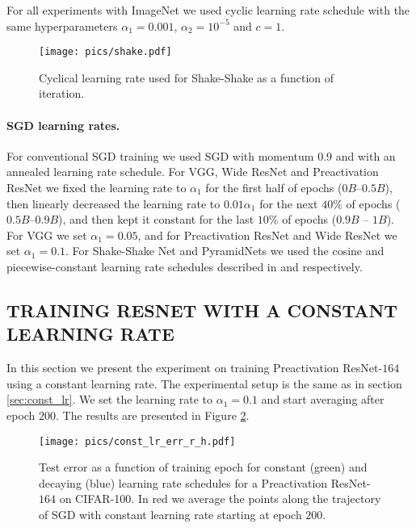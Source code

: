 \documentclass[letterpaper]{article}
\begin{document}
For all experiments with ImageNet we used cyclic learning rate schedule with the same 
hyperparameters  $\alpha_1 =0.001$, $\alpha_2=10^{-5}$ and $c=1$.

\begin{figure}[!t]
	\centering
	\texttt{[image: pics/shake.pdf]}
	\caption{
        Cyclical learning rate used for Shake-Shake as a function of iteration. 
    }
	\label{fig:lr_shk}    	
\end{figure}

\paragraph{SGD learning rates.}
For conventional SGD training we used SGD with momentum $0.9$ and with
an annealed learning rate schedule. For VGG, Wide ResNet and Preactivation 
ResNet we fixed the learning rate to $\alpha_1$ for the first half of epochs
($0B$--$0.5B$), then linearly decreased the learning rate to $0.01 \alpha_1$ 
for the next $40\%$ of epochs ($0.5B$--$0.9B$), and then kept it constant
for the last $10\%$ of epochs ($0.9B$ -- $1 B$). For VGG we set $\alpha_1 = 0.05$,
and for Preactivation ResNet and Wide ResNet we set $\alpha_1 = 0.1$. For 
Shake-Shake Net and PyramidNets we used the cosine and piecewise-constant 
learning rate schedules described in \citet{gastaldi2017shake} and \citet{han2016deep}
respectively.

\subsection{TRAINING RESNET WITH A CONSTANT LEARNING RATE}

In this section we present the experiment on training Preactivation ResNet-$164$
using a constant learning rate. The experimental setup is the same as in 
section \ref{sec:const_lr}. We set the learning rate to $\alpha_1 = 0.1$ and
start averaging after epoch $200$. The 
results are presented in Figure \ref{fig:resnet_convergence}.

\begin{figure}[!h]
	\centering
	\texttt{[image: pics/const\_lr\_err\_r\_h.pdf]}
	\caption{Test error as a function of training epoch for constant (green) and 
  decaying (blue) learning rate schedules for 
  a Preactivation ResNet-$164$ on CIFAR-100. In red we average
  the points along the 
  trajectory of SGD with constant learning rate starting at epoch $200$.}
  \label{fig:resnet_convergence}
\end{figure}
\end{document}
